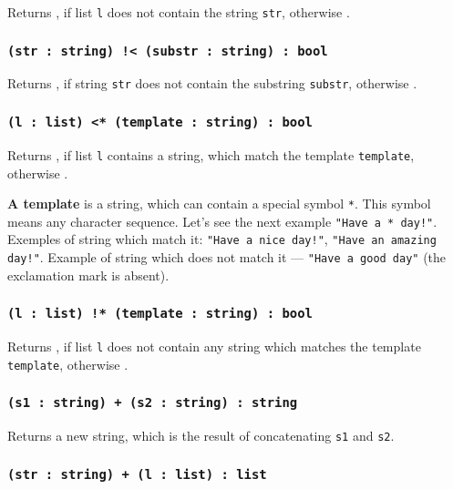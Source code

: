 Returns \true{}, if list \texttt{l} does not contain the string \texttt{str}, otherwise \false{}.

\subsubsection{\texttt{(str : string) !< (substr : string) : bool}}

Returns \true{}, if string \texttt{str} does not contain the substring \texttt{substr}, otherwise \false{}.

\subsubsection{\texttt{(l : list) <* (template : string) : bool}}

Returns \true{}, if list \texttt{l} contains a string, which match the template \texttt{template}, otherwise \false{}.

{\bf A template} is a string, which can contain a special symbol \texttt{*}. This symbol means any character sequence. Let's see the next example \texttt{"Have a * day!"}. Exemples of string which match it: \texttt{"Have a nice day!"}, \texttt{"Have an amazing day!"}. Example of string which does not match it — \texttt{"Have a good day"} (the exclamation mark is absent).

\subsubsection{\texttt{(l : list) !* (template : string) : bool}}

Returns \true{}, if list \texttt{l} does not contain any string which matches the template \texttt{template}, otherwise \false{}.

\subsubsection{\texttt{(s1 : string) + (s2 : string) : string}}

Returns a new string, which is the result of concatenating \texttt{s1} and \texttt{s2}.

\subsubsection{\texttt{(str : string) + (l : list) : list}}

